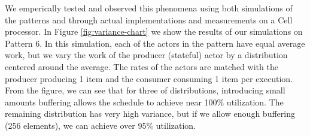 We emperically tested and observed this phenomena using both
simulations of the patterns and through actual implementations and
measurements on a Cell processor.  In Figure \ref{fig:variance-chart}
we show the results of our simulations on Pattern 6.  In this
simulation, each of the actors in the pattern have equal average work,
but we vary the work of the producer (stateful) actor by a
distribution centered around the average.  The rates of the actors are
matched with the producer producing 1 item and the consumer consuming
1 item per execution.  From the figure, we can see that for three of
distributions, introducing small amounts buffering allows the schedule
to achieve near 100\% utilization.  The remaining distribution has
very high variance, but if we allow enough buffering (256 elements),
we can achieve over 95\% utilization.
